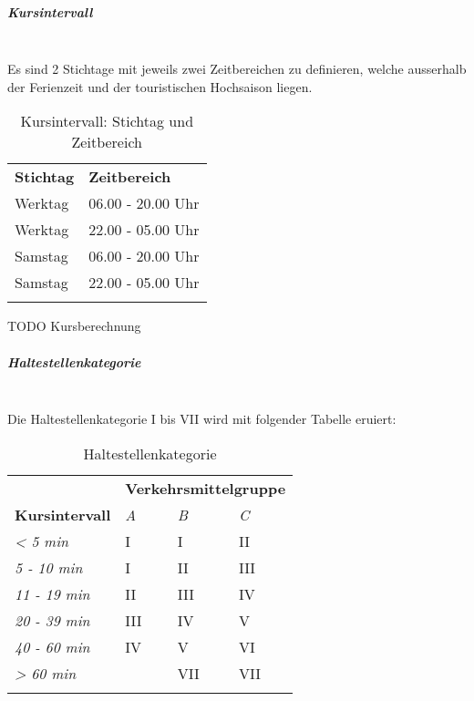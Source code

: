 \subparagraph{Kursintervall}~\\
\label{Berechnungsmethodik OeVGK18:Kursintervall}
Es sind 2 Stichtage mit jeweils zwei Zeitbereichen zu definieren, welche ausserhalb der Ferienzeit und der touristischen Hochsaison liegen.

\begin{longtable}[c]{l l}
    \midrule
    \textbf{Stichtag}
                            & \textbf{Zeitbereich}\\
    Werktag
                            & 06.00 - 20.00 Uhr\\
    Werktag
                            & 22.00 - 05.00 Uhr\\
    Samstag
                            & 06.00 - 20.00 Uhr\\
    Samstag
                            & 22.00 - 05.00 Uhr\\
    \bottomrule
\caption{Kursintervall: Stichtag und Zeitbereich}
\label{table:Ermittlung Kursintervall: Stichtag und Zeitbereich}
\end{longtable}

TODO Kursberechnung

\subparagraph{Haltestellenkategorie}~\\
\label{Berechnungsmethodik OeVGK18:Haltestellenkategorie}
Die Haltestellenkategorie I bis VII wird mit folgender Tabelle eruiert:

\begin{longtable}[c]{l p{4.0cm} p{4.0cm} p{4.0cm}}
    \midrule
    \textbf{}
                            & \multicolumn{3}{l}{\textbf{Verkehrsmittelgruppe}}\\
    \textbf{Kursintervall}
                            & \textit{A}
                            & \textit{B}
                            & \textit{C}\\
    \textit{< 5 min}
                            & I
                            & I
                            & II\\
    \textit{5 - 10 min}
                            & I
                            & II
                            & III\\
    \textit{11 - 19 min}
                            & II
                            & III
                            & IV\\
    \textit{20 - 39 min}
                            & III
                            & IV
                            & V\\
    \textit{40 - 60 min}
                            & IV
                            & V
                            & VI\\
    \textit{> 60 min}
                            &
                            & VII
                            & VII\\
    \bottomrule
\caption{Haltestellenkategorie}
\label{Haltestellenkategorie}
\end{longtable}

